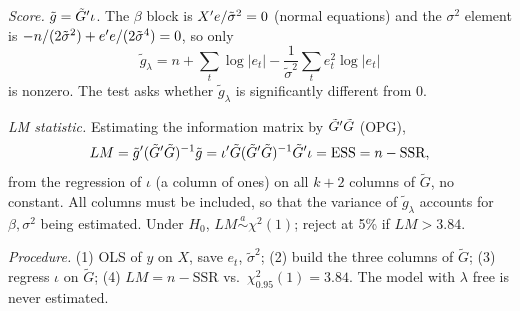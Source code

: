 \documentclass[11pt]{article}
\begin{document}
\emph{Score.} $\tilde g=\tilde G^{\prime}\iota$. The $\beta$ block is $X^{\prime} e/\tilde\sigma^2=0$ (normal equations) and the $\sigma^2$ element is
$-n/(2\tilde\sigma^2)+e^{\prime} e/(2\tilde\sigma^4)=0$, so only
\[
  \tilde g_\lambda=n+\sum_t\log|e_t|-\frac1{\tilde\sigma^2}\sum_te_t^2\log|e_t|
\]
is nonzero. The test asks whether $\tilde g_\lambda$ is significantly different from 0.

\emph{LM statistic.} Estimating the information matrix by $\tilde G^{\prime}\tilde G$ (OPG),
\[
  LM=\tilde g^{\prime}(\tilde G^{\prime}\tilde G)^{-1}\tilde g=\iota^{\prime}\tilde G(\tilde G^{\prime}\tilde G)^{-1}\tilde G^{\prime}\iota=\text{ESS}=n-\text{SSR},
\]
from the regression of $\iota$ (a column of ones) on all $k+2$ columns of $\tilde G$, no constant.
All columns must be included, so that the variance of $\tilde g_\lambda$ accounts for $\beta,\sigma^2$ being estimated.
Under $H_0$, $LM\overset{a}{\sim}\chi^2(1)$; reject at 5\% if $LM>3.84$.

\emph{Procedure.} (1) OLS of $y$ on $X$, save $e_t$, $\tilde\sigma^2$; (2) build the three columns of $\tilde G$;
(3) regress $\iota$ on $\tilde G$; (4) $LM=n-\text{SSR}$ vs.\ $\chi^2_{0.95}(1)=3.84$. The model with $\lambda$ free is never estimated.

\newpage
{}

\end{document}
